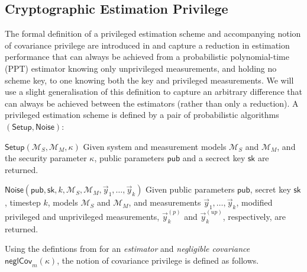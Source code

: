 \documentclass[conference]{IEEEtran}
\begin{document}
% 
% 

\subsection{Cryptographic Estimation Privilege}\label{subsec:crypto_privilege}
The formal definition of a privileged estimation scheme and accompanying notion of covariance privilege are introduced in \cite{risticCryptographicallyPrivilegedState2022} and capture a reduction in estimation performance that can always be achieved from a probabilistic polynomial-time (PPT) estimator knowing only unprivileged measurements, and holding no scheme key, to one knowing both the key and privileged measurements. We will use a slight generalisation of this definition to capture an arbitrary difference that can always be achieved between the estimators (rather than only a reduction).
A privileged estimation scheme is defined by a pair of probabilistic algorithms $(\mathsf{Setup}, \mathsf{Noise})$:
\begin{LaTeXdescription}
  \item[$\mathsf{Setup}(\mathcal{M}_S,\mathcal{M}_M,\kappa)$] Given system and measurement models $\mathcal{M}_S$ and $\mathcal{M}_M$, and the security parameter $\kappa$, public parameters $\mathsf{pub}$ and a secrect key $\mathsf{sk}$ are returned.
  \item[$\mathsf{Noise}(\mathsf{pub},\mathsf{sk},k,\mathcal{M}_S,\mathcal{M}_M,\vec{y}_1,\dots,\vec{y}_k)$] Given public parameters $\mathsf{pub}$, secret key $\mathsf{sk}$, timestep $k$, models $\mathcal{M}_S$ and $\mathcal{M}_M$, and measurements $\vec{y}_1,\dots,\vec{y}_k$, modified privileged and unprivileged measurements, $\vec{y}^{(p)}_k$ and $\vec{y}^{(up)}_k$, respectively, are returned.
\end{LaTeXdescription}
Using the defintions from \cite{risticCryptographicallyPrivilegedState2022} for an \textit{estimator} and \textit{negligible covariance} $\mathsf{neglCov}_m(\kappa)$, the notion of covariance privilege is defined as follows.
\end{document}
